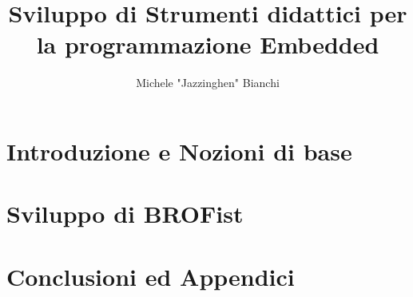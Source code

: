 \documentclass[10pt,a4paper,cleardoubleempty]{scrbook}
\author{Michele "Jazzinghen" Bianchi}
\title{Sviluppo di Strumenti didattici per la programmazione Embedded}
\begin{document}
    \tableofcontents
    \cleardoublepage
    
    
    
    \part{Introduzione e Nozioni di base}
    
    

    \part{Sviluppo di BROFist}

    
    

    \part{Conclusioni ed Appendici}
    
    
\end{document}
